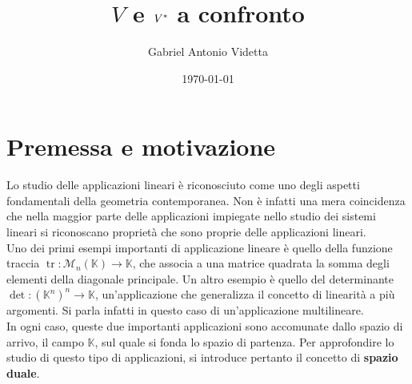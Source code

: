 \documentclass[a4paper]{article}
\title{$V$ e $V^{*}$ a confronto}
\author{Gabriel Antonio Videtta}
\date{\today}
\DeclareMathOperator{\tr}{tr}
\begin{document}
\maketitle

\newcommand{\BB}{\mathcal{B}}
\newcommand{\FF}{\mathbb{F}_2}
\newcommand{\NN}{\mathbb{N}}
\newcommand{\ZZ}{\mathbb{Z}}
\newcommand{\KK}{\mathbb{K}}
\newcommand{\LL}[2]{\mathcal{L} \left(#1, \, #2\right)}

\newcommand{\MM}[2]{\mathcal{M}_{#1 \times #2}\left(\KK\right)}
\newcommand{\M}[1]{\mathcal{M}_{#1}\left(\KK\right)}
\newcommand{\Mbb}[3]{\mathcal{M}^{#1}_{#2} \left( #3 \right)}
\newcommand{\Mb}[2]{\mathcal{M}^{#1}_{#2}}

\theoremstyle{definition}
\newtheorem{definition}{Definizione}[section]

\renewcommand{\vec}[1]{\underline{#1}}

\newtheorem{example}{Esempio}[section]
\newtheorem{exercise}{Esercizio}[section]
\newtheorem{theorem}{Teorema}[section]
\newtheorem{proposition}{Proposizione}[section]
\newtheorem{corollary}{Corollario}[section]

\tableofcontents

\section{Premessa e motivazione}

Lo studio delle applicazioni lineari è riconosciuto come uno
degli aspetti fondamentali della geometria contemporanea. Non è
infatti una mera coincidenza che nella maggior parte delle
applicazioni impiegate nello studio dei sistemi lineari si
riconoscano proprietà che sono proprie delle applicazioni lineari. \\

Uno dei primi esempi importanti di applicazione lineare è
quello della funzione traccia $\tr : \M{n} \to \KK$, che
associa a una matrice quadrata la somma degli elementi della
diagonale principale. Un altro esempio è quello del determinante
$\det : \left(\KK^{n}\right)^n \to \KK$, un'applicazione che generalizza
il concetto di linearità a più argomenti. Si parla infatti in
questo caso di un'applicazione multilineare. \\

In ogni caso, queste due importanti applicazioni sono
accomunate dallo spazio di arrivo, il campo $\KK$, sul
quale si fonda lo spazio di partenza. Per approfondire lo
studio di questo tipo di applicazioni, si introduce
pertanto il concetto di \textbf{spazio duale}.
\end{document}
